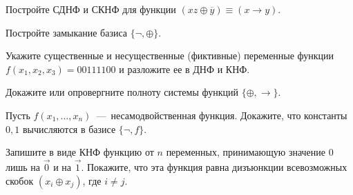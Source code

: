 
\setcounter{example}{0}

\begin{exercise}
Постройте СДНФ и СКНФ для функции $(xz\oplus\overline{y})\equiv(x\to y)$.
\end{exercise}

\begin{solution}
\end{solution}

\begin{exercise}
Постройте замыкание базиса $\{\neg,\oplus\}$.
\end{exercise}

\begin{solution}
\end{solution}

\begin{exercise}
Укажите существенные и несущественные (фиктивные) переменные функции 
	$f(x_1,x_2,x_3)=00111100$ и разложите ее в ДНФ и КНФ.
\end{exercise}

\begin{solution}
\end{solution}

\begin{exercise}
Докажите или опровергните полноту системы функций $\{\oplus,\to\}$.
\end{exercise}

\begin{solution}
\end{solution}

\begin{exercise}
Пусть $f(x_1,\ldots,x_n)$~---~несамодвойственная функция. Докажите, что
	константы $0, 1$ вычисляются в базисе $\{\neg, f\}$.
\end{exercise}

\begin{solution}
\end{solution}

\begin{exercise}
Запишите в виде КНФ функцию от $n$ переменных, принимающую значение
	$0$ лишь на $\vec{0}$ и на $\vec{1}$. Покажите, что эта функция равна
	дизъюнкции всевозможных скобок $(x_i\oplus x_j)$, где $i\neq j$. 
\end{exercise}

\begin{solution}
\end{solution}

